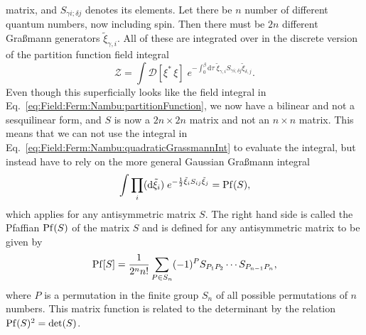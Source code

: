 matrix, and $S_{\gamma i; \delta j}$ denotes its elements. Let there be $n$ number of different quantum numbers,
now including spin. Then there must be $2n$ different Gra\ss mann generators $\tilde{\xi}_{\gamma,i}$. All of these are integrated over in the discrete version
of the partition function field integral
\begin{equation}
    \label{eq:Field:Ferm:ExNambu:partitionFunction}
    \mathcal{Z} = \int\!\mathcal{D}[\xi^\ast\,\xi]\;e^{-\int_0^\beta\!\mathrm{d}\tau\;\tilde{\xi}_{\gamma,i}S_{\gamma i; \delta j}\tilde{\xi}_{\delta, j}}.
\end{equation}
Even though this superficially looks like the field integral in Eq.~\eqref{eq:Field:Ferm:Nambu:partitionFunction}, we now have a bilinear and not a sesquilinear
form, and $S$ is now a $2n\times2n$ matrix and not an $n\times n$ matrix. This means that we can not use the integral in Eq.~\eqref{eq:Field:Ferm:Nambu:quadraticGrassmannInt}
to evaluate the integral, but instead have to rely on the more general Gaussian Gra\ss mann integral
\begin{equation}
    \label{eq:Field:Ferm:ExNambu:pfaffianIntegral}
    \int\prod_{i}(\mathrm{d}\tilde{\xi}_i)\;e^{-\frac{1}{2}\tilde{\xi}_iS_{ij}\tilde{\xi}_j} = \operatorname{Pf}(S),
\end{equation}
which applies for any antisymmetric matrix $S$. The right hand side is called the Pfaffian $\operatorname{Pf}(S)$ of the matrix $S$ and is defined for any antisymmetric
matrix to be given by
\begin{equation}
    \label{eq:Field:Ferm:ExNambu:pfaffianDef}
    \operatorname{Pf}[S] = \frac{1}{2^nn!}\sum_{P\in S_n}(-1)^PS_{P_1P_2}\cdots S_{P_{n-1}P_n},
\end{equation}
where $P$ is a permutation in the finite group $S_n$ of all possible permutations of $n$ numbers. This matrix function is related to the determinant
by the relation $\operatorname{Pf}(S)^2 = \det(S)$. 

